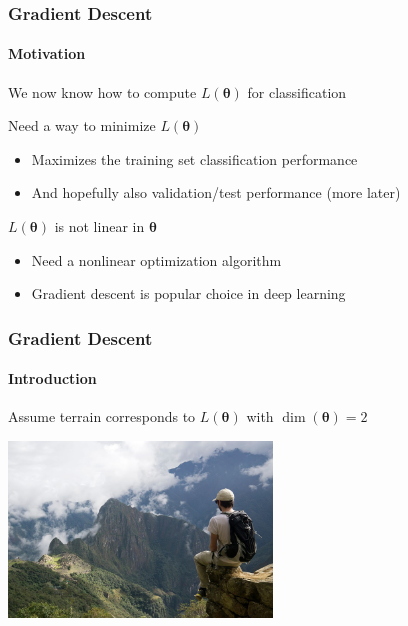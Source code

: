 \documentclass[xetex,professionalfont]{beamer}
\renewcommand\emph[1]{\textcolor{tuwcvl_cvl_blue}{#1}}
\newcommand{\bth}{\boldsymbol{\theta}}
\begin{document}
\begin{frame}
  \frametitle{Gradient Descent}
  \framesubtitle{Motivation}

We now know how to compute $L(\bth)$ for classification

\bigskip

Need a way to minimize $L(\bth)$
\begin{itemize}
    \item Maximizes the training set classification performance %
    \item And hopefully also validation/test performance (more later) %
\end{itemize} 

\bigskip
 
$L(\bth)$ is not linear in $\bth$ %
\begin{itemize}
    \item Need a \emph{nonlinear optimization} algorithm
    \item \emph{Gradient descent} is popular choice in deep learning
\end{itemize}

\end{frame}


\begin{frame}
  \frametitle{Gradient Descent}
  \framesubtitle{Introduction}

Assume terrain corresponds to $L(\bth)$ with $\dim(\bth)=2$

\bigskip

\begin{center}
\includegraphics[width=7cm]{images/mp.jpg}
\end{center}

\end{frame}
\end{document}
